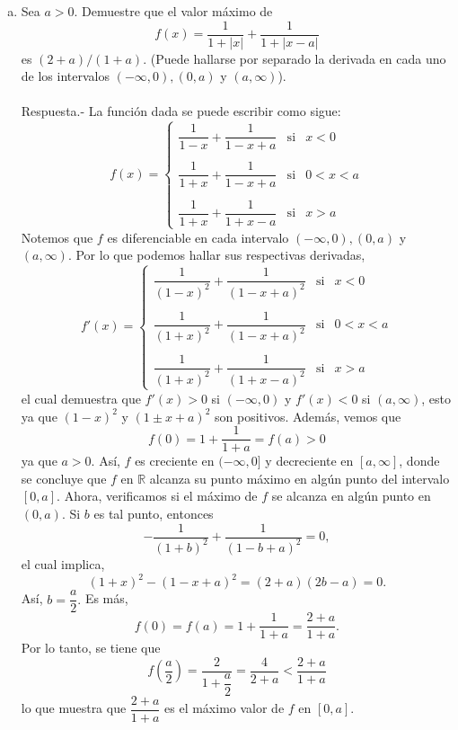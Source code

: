 \begin{enumerate}[\bfseries 1.]
\begin{enumerate}[(a)]
	    \item Sea $a>0$. Demuestre que el valor máximo de 
	    $$f(x)=\dfrac{1}{1+|x|}+\dfrac{1}{1+|x-a|}$$
	    es $(2+a)/(1+a)$. (Puede hallarse por separado la derivada en cada uno de los intervalos $(-\infty,0),(0,a)$ y $(a,\infty)$).\\\\
		Respuesta.-\; La función dada se puede escribir como sigue:
		$$f(x)=\left\{\begin{array}{rclcl}
			\dfrac{1}{1-x}+\dfrac{1}{1-x+a} &\mbox{si}& x<0\\\\
			\dfrac{1}{1+x}+\dfrac{1}{1-x+a} &\mbox{si}& 0<x<a\\\\
			\dfrac{1}{1+x}+\dfrac{1}{1+x-a} &\mbox{si}& x>a
		\end{array}\right.$$
		Notemos que $f$ es diferenciable en cada intervalo $(-\infty,0),(0,a)$ y $(a,\infty)$. Por lo que podemos hallar sus respectivas derivadas,
		$$f'(x)=\left\{\begin{array}{rclcl}
			\dfrac{1}{(1-x)^2}+\dfrac{1}{(1-x+a)^2} &\mbox{si}& x<0\\\\
			\dfrac{1}{(1+x)^2}+\dfrac{1}{(1-x+a)^2} &\mbox{si}& 0<x<a\\\\
			\dfrac{1}{(1+x)^2}+\dfrac{1}{(1+x-a)^2} &\mbox{si}& x>a
		\end{array}\right.$$
		el cual demuestra que $f'(x)>0$ si $(-\infty,0)$ y $f'(x)<0$ si $(a,\infty)$, esto ya que $(1-x)^2$ y $(1\pm x+a)^2$ son positivos. Además, vemos que
		$$f(0)=1+\dfrac{1}{1+a}=f(a)>0$$
		ya que $a>0.$ Así, $f$ es creciente en $(-\infty,0]$ y decreciente en $[a,\infty]$, donde se concluye que $f$ en $\mathbb{R}$ alcanza su punto máximo en algún punto del intervalo $[0,a]$. Ahora, verificamos si el máximo de $f$ se alcanza en algún punto en $(0,a)$. Si $b$ es tal punto, entonces 
		$$-\dfrac{1}{(1+b)^2}+\dfrac{1}{(1-b+a)^2}=0,$$
		el cual implica,
		$$(1+x)^2-(1-x+a)^2=(2+a)(2b-a)=0.$$
		Así, $b=\dfrac{a}{2}.$ Es más,
		$$f(0)=f(a)=1+\dfrac{1}{1+a}=\dfrac{2+a}{1+a}.$$
		Por lo tanto, se tiene que
		$$f\left(\dfrac{a}{2}\right)=\dfrac{2}{1+\dfrac{a}{2}}=\dfrac{4}{2+a}<\dfrac{2+a}{1+a}$$
		lo que muestra que $\dfrac{2+a}{1+a}$ es el máximo valor de $f$ en $[0,a]$.\\\\

	\end{enumerate}


\end{enumerate}
